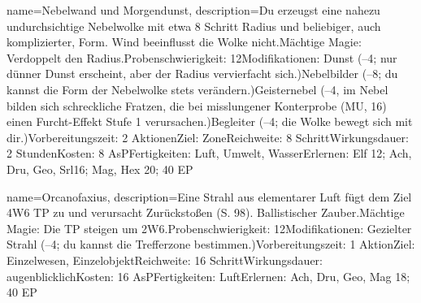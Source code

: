 {
    name={Nebelwand und Morgendunst},
    description={Du erzeugst eine nahezu undurchsichtige Nebelwolke mit etwa 8 Schritt Radius und beliebiger, auch komplizierter, Form. Wind beeinflusst die Wolke nicht.\newline Mächtige Magie: Verdoppelt den Radius.\newline Probenschwierigkeit: 12\newline Modifikationen: Dunst (–4; nur dünner Dunst erscheint, aber der Radius vervierfacht sich.)\newline Nebelbilder (–8; du kannst die Form der Nebelwolke stets verändern.)\newline Geisternebel (–4, im Nebel bilden sich schreckliche Fratzen, die bei misslungener Konterprobe (MU, 16) einen Furcht-Effekt Stufe 1 verursachen.)\newline Begleiter (–4; die Wolke bewegt sich mit dir.)\newline Vorbereitungszeit: 2 Aktionen\newline Ziel: Zone\newline Reichweite: 8 Schritt\newline Wirkungsdauer: 2 Stunden\newline Kosten: 8 AsP\newline Fertigkeiten: Luft, Umwelt, Wasser\newline Erlernen: Elf 12; Ach, Dru, Geo, Srl16; Mag, Hex 20; 40 EP}
}


{
    name={Orcanofaxius},
    description={Eine Strahl aus elementarer Luft fügt dem Ziel 4W6 TP zu und verursacht Zurückstoßen (S. 98). Ballistischer Zauber.\newline Mächtige Magie: Die TP steigen um 2W6.\newline Probenschwierigkeit: 12\newline Modifikationen: Gezielter Strahl (–4; du kannst die Trefferzone bestimmen.)\newline Vorbereitungszeit: 1 Aktion\newline Ziel: Einzelwesen, Einzelobjekt\newline Reichweite: 16 Schritt\newline Wirkungsdauer: augenblicklich\newline Kosten: 16 AsP\newline Fertigkeiten: Luft\newline Erlernen: Ach, Dru, Geo, Mag 18; 40 EP}
}


